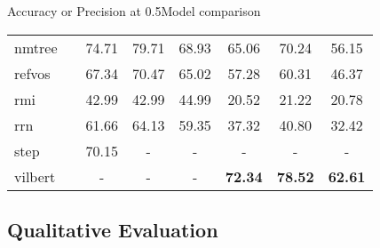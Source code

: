 \documentclass{beamer}
\begin{document}
\begin{frame}{Accuracy or Precision at 0.5}{Model comparison}
{\begin{tabular}{lc*6c}
      \acs{nmtree}     & \cite{liu19:learn_assem_neural_modul_tree}                   & 74.71          & 79.71          & 68.93          & 65.06          & 70.24          & 56.15          \\
      \acs{refvos}     & \cite{bellver20:refvos}                                      & 67.34          & 70.47          & 65.02          & 57.28          & 60.31          & 46.37          \\
      \acs{rmi}        & \cite{liu17:recur_multim_inter_refer_image_segmen}           & 42.99          & 42.99          & 44.99          & 20.52          & 21.22          & 20.78          \\
      \acs{rrn}        & \cite{li18:refer_image_segmen_recur_refin_networ}            & 61.66          & 64.13          & 59.35          & 37.32          & 40.80          & 32.42          \\
      \acs{step}       & \cite{chen19:see_throug_text_group_refer_image_segmen}       & 70.15          & -              & -              & -              & -              & -              \\
      \acs{vilbert}    & \cite{lu19:vilber}                                           & -              & -              & -              & \textbf{72.34} & \textbf{78.52} & \textbf{62.61} \\
      \bottomrule
    \end{tabular}
  }

\end{frame}


\subsection{Qualitative Evaluation}
\end{document}
